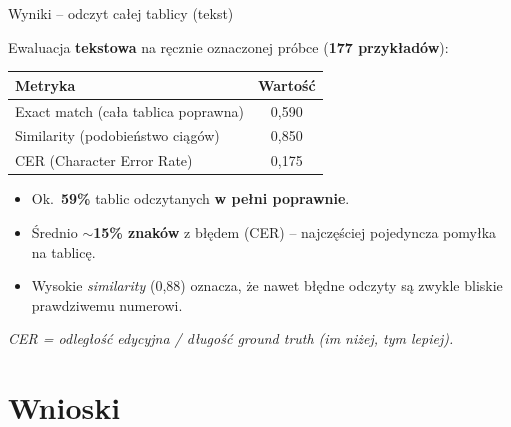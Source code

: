 \documentclass{beamer}
\begin{document}

\begin{frame}{Wyniki -- odczyt całej tablicy (tekst)}

Ewaluacja \textbf{tekstowa} na ręcznie oznaczonej próbce (\textbf{177 przykładów}):

\vspace{0.2cm}

\begin{center}
\begin{tabular}{lc}
\toprule
\textbf{Metryka} & \textbf{Wartość} \\
\midrule
Exact match (cała tablica poprawna) & 0{,}590 \\
Similarity (podobieństwo ciągów)    & 0{,}850 \\
CER (Character Error Rate)          & 0{,}175 \\
\bottomrule
\end{tabular}
\end{center}

\vspace{0.2cm}

\begin{itemize}
    \item Ok.\ \textbf{59\%} tablic odczytanych \textbf{w pełni poprawnie}.
    \item Średnio \textbf{$\sim$15\% znaków} z błędem (CER) -- najczęściej
    pojedyncza pomyłka na tablicę.
    \item Wysokie \emph{similarity} (0{,}88) oznacza, że nawet błędne odczyty
    są zwykle bliskie prawdziwemu numerowi.
\end{itemize}

\vspace{0.2cm}

\footnotesize
\textit{CER = odległość edycyjna / długość ground truth (im niżej, tym lepiej).}

\end{frame}






\section{Wnioski}
\end{document}
